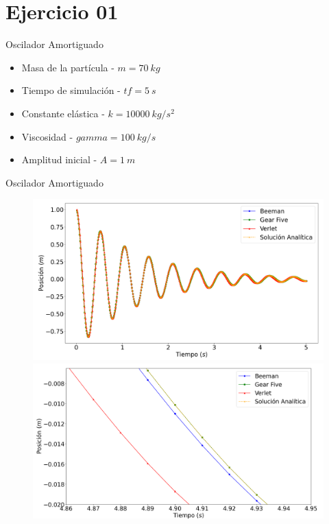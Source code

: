 \section{Ejercicio 01}\label{sec:ejercicio1}

\begin{frame}{Oscilador Amortiguado}
    \begin{itemize}
            \item Masa de la partícula - $m = 70\ kg$
            \item Tiempo de simulación - $tf = 5\ s$
            \item Constante elástica - $k = 10000\ kg/s^2$
            \item Viscosidad - $gamma = 100\ kg/s$
            \item Amplitud inicial - $A = 1\ m$
        \end{itemize}
\end{frame}

\begin{frame}{Oscilador Amortiguado}
    \begin{figure}[H]
        \includegraphics[width=1\linewidth]{pic/00-ejercicio1/todos.png}\label{fig:osciladores}
        \includegraphics[width=1\linewidth]{pic/00-ejercicio1/zoom.png}\label{fig:osciladoreszoom}
    \end{figure}
\end{frame}

